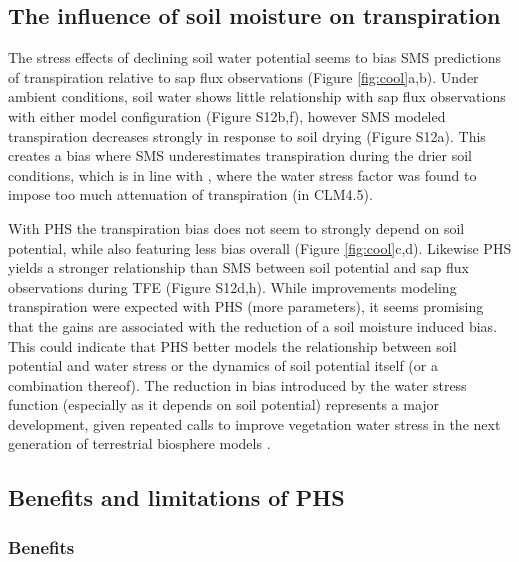 \documentclass[draft,linenumbers]{agujournal}
\begin{document}
\subsection{The influence of soil moisture on transpiration}
    \label{sect:smt}
    The stress effects of declining soil water potential seems to bias SMS predictions of transpiration relative to sap flux observations (Figure \ref{fig:cool}a,b).
    Under ambient conditions, soil water shows little relationship with sap flux observations with either model configuration (Figure S12b,f),
    however SMS modeled transpiration decreases strongly in response to soil drying (Figure S12a).
    This creates a bias where SMS underestimates transpiration during the drier soil conditions, 
    which is in line with \cite{bonan2014}, where the water stress factor was found to impose too much attenuation of transpiration (in CLM4.5).
    
    With PHS the transpiration bias does not seem to strongly depend on soil potential, while also featuring less bias overall (Figure \ref{fig:cool}c,d).
    Likewise PHS yields a stronger relationship than SMS between soil potential and sap flux observations during TFE (Figure S12d,h).
    While improvements modeling transpiration were expected with PHS (more parameters), it seems promising that the gains are associated with the reduction of a soil moisture induced bias.
    This could indicate that PHS better models the relationship between soil potential and water stress or the dynamics of soil potential itself (or a combination thereof).
    The reduction in bias introduced by the water stress function (especially as it depends on soil potential) represents a major development, given repeated calls to improve vegetation water stress in the next generation of terrestrial biosphere models \citep{powell2013,rogers2017,trugman2018}.

\subsection{Benefits and limitations of PHS}

\subsubsection{Benefits}
\end{document}
